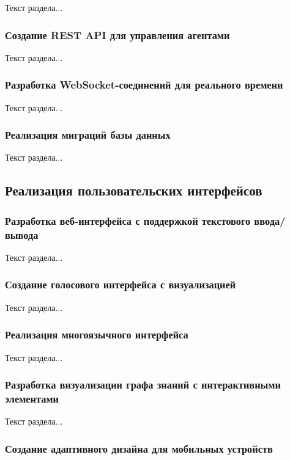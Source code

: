 Текст раздела...

\subsubsection{Создание REST API для управления агентами}

Текст раздела...

\subsubsection{Разработка WebSocket-соединений для реального времени}

Текст раздела...

\subsubsection{Реализация миграций базы данных}

Текст раздела...

\subsection{Реализация пользовательских интерфейсов}

\subsubsection{Разработка веб-интерфейса с поддержкой текстового ввода/вывода}

Текст раздела...

\subsubsection{Создание голосового интерфейса с визуализацией}

Текст раздела...

\subsubsection{Реализация многоязычного интерфейса}

Текст раздела...

\subsubsection{Разработка визуализации графа знаний с интерактивными элементами}

Текст раздела...

\subsubsection{Создание адаптивного дизайна для мобильных устройств}

